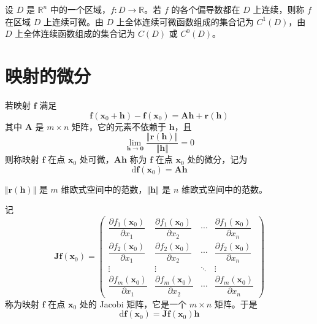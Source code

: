 \begin{remark}
    设 $D$ 是 $\mathbb{R}^n$ 中的一个区域，$f: D \to \mathbb{R}$。若 $f$ 的各个偏导数都在 $D$ 上连续，则称 $f$ 在区域 $D$ 上连续可微。由 $D$ 上全体连续可微函数组成的集合记为 $C^{1}(D)$，由 $D$ 上全体连续函数组成的集合记为 $C(D)$ 或 $C^{0}(D)$。
\end{remark}



\section{映射的微分}

\begin{definition}
    若映射 $\bm{f}$ 满足
    \[
        \bm{f}(\bm{x}_0 + \bm{h}) - \bm{f}(\bm{x}_0) = \bm{Ah} + \bm{r}(\bm{h})
    \]
    其中 $\bm{A}$ 是 $m \times n$ 矩阵，它的元素不依赖于 $\bm{h}$，且
    \[
        \lim_{\bm{h} \to \bm{0}}\frac{\Vert \bm{r}(\bm{h}) \Vert }{\Vert \bm{h} \Vert } = 0
    \]
    则称映射 $\bm{f}$ 在点 $\bm{x}_0$ 处可微，$\bm{Ah}$ 称为 $\bm{f}$ 在点 $\bm{x}_0$ 处的微分，记为
    \[
        \mathrm{d}\bm{f}(\bm{x}_0) = \bm{Ah}
    \]
\end{definition}

\begin{remark}
  $\Vert \bm{r}(\bm{h}) \Vert$ 是 $m$ 维欧式空间中的范数，$\Vert \bm{h} \Vert$ 是 $n$ 维欧式空间中的范数。
\end{remark}

\begin{definition}
    记
    \[
        \renewcommand\arraystretch{1.8}
        \bm{J}\bm{f}(\bm{x}_0) = \begin{pmatrix}
            \dfrac{\partial f_1(\bm{x}_0)}{\partial x_1} & \dfrac{\partial f_1(\bm{x}_0)}{\partial x_2} & \cdots & \dfrac{\partial f_1(\bm{x}_0)}{\partial x_n} \\
            \dfrac{\partial f_2(\bm{x}_0)}{\partial x_1} & \dfrac{\partial f_2(\bm{x}_0)}{\partial x_2} & \cdots & \dfrac{\partial f_2(\bm{x}_0)}{\partial x_n} \\
            \vdots                                       & \vdots                                       & \ddots & \vdots                                       \\
            \dfrac{\partial f_m(\bm{x}_0)}{\partial x_1} & \dfrac{\partial f_m(\bm{x}_0)}{\partial x_2} & \cdots & \dfrac{\partial f_m(\bm{x}_0)}{\partial x_n}
        \end{pmatrix}
    \]
    称为映射 $\bm{f}$ 在点 $\bm{x}_0$ 处的 Jacobi 矩阵，它是一个 $m \times n$ 矩阵。于是
    \[
        \mathrm{d}\bm{f}(\bm{x}_0) = \bm{J}\bm{f}(\bm{x}_0)\bm{h}
    \]
\end{definition}

